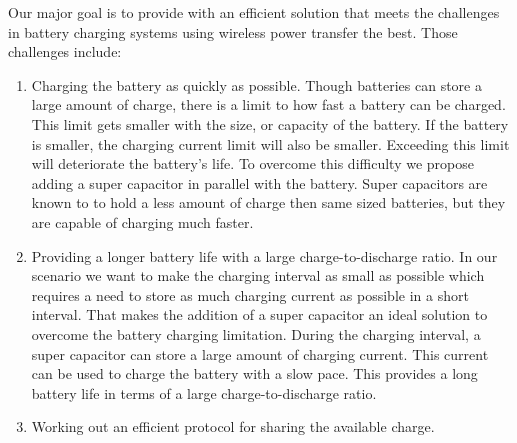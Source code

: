 Our major goal is to provide with an efficient solution that meets the challenges in battery charging systems using wireless power transfer the best.
Those challenges include:
\begin{enumerate}
\item Charging the battery as quickly as possible. 
Though batteries can store a large amount of charge, there is a limit to how fast a battery can be charged. This limit gets smaller with the size, or capacity of the battery. If the battery is smaller, the charging current limit will also be smaller. Exceeding this limit will deteriorate the battery's life. To overcome this difficulty we propose adding a super capacitor in parallel with the battery. Super capacitors are known to to hold a less amount of charge then same sized batteries, but they are capable of charging much faster\cite{IAmp}.
\item Providing a longer battery life with a large charge-to-discharge ratio.
In our scenario we want to make the charging interval as small as possible which requires a need to store as much charging current as possible in a short interval. That makes the addition of a super capacitor an ideal solution to overcome the battery charging limitation. During the charging interval, a super capacitor can store a large amount of charging current. This current can be used to charge the battery with a slow pace. This provides a long battery life in terms of a large charge-to-discharge ratio.
 
\item Working out an efficient protocol for sharing the available charge.

\end{enumerate}
